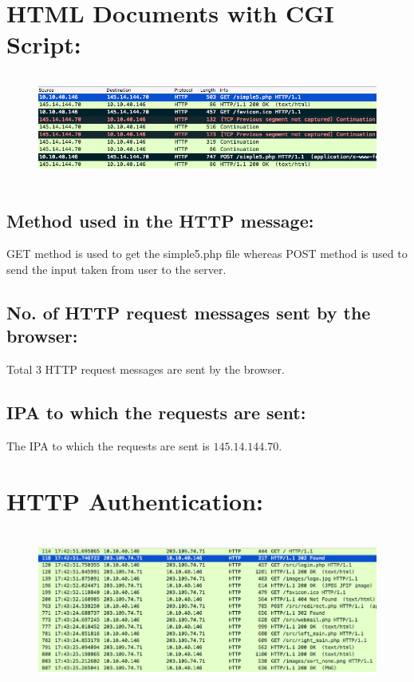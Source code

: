 \documentclass[]{report}
\begin{document}
\section{HTML Documents with CGI Script:}
\begin{figure}[H]
	\vspace{0pt}
	\includegraphics[height = 100pt, keepaspectratio]{Snapshots/q4/4.png}
\end{figure}
\subsection{Method used in the HTTP message:}
GET method is used to get the simple5.php file whereas POST method is used to send the input taken from user to the server.
\subsection{No. of HTTP request messages sent by the browser:}
Total 3 HTTP request messages are sent by the browser.
\subsection{IPA to which the requests are sent:}
The IPA to which the requests are sent is $145.14.144.70$.


\section{HTTP Authentication:}
\begin{figure}[H]
	\vspace{0pt}
	\includegraphics[height = 150pt, keepaspectratio]{Snapshots/q5/5_1.png}
\end{figure}
\end{document}
